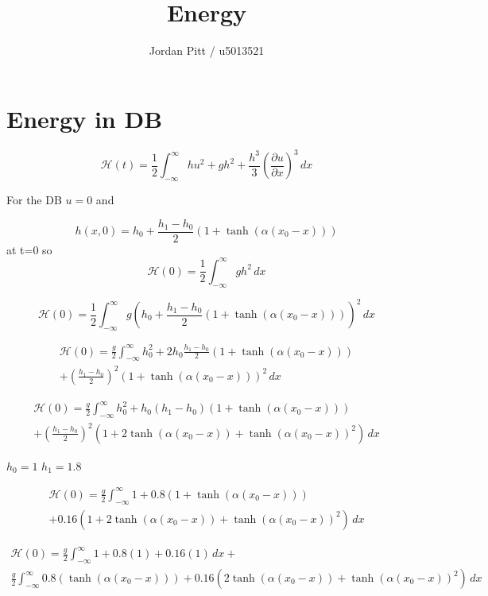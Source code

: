 \documentclass[12pt]{article}
\begin{document}
\title{Energy}
\author{Jordan Pitt / u5013521}

\section{Energy in DB}

\[\mathcal{H} (t) = \frac{1}{2}\int_{-\infty}^{\infty} hu^2 + gh^2 + \frac{h^3}{3} \left(\frac{\partial u}{\partial x}\right)^3\, dx \]

For the DB $u = 0$ and

\[h(x,0) = h_0 + \frac{h_1 - h_0}{2}\left(1 + \tanh\left(\alpha\left(x_0 - x\right)\right)\right)\]
at t=0 so
\[\mathcal{H} (0) = \frac{1}{2}\int_{-\infty}^{\infty}  gh^2 \, dx \]

\[\mathcal{H} (0) = \frac{1}{2}\int_{-\infty}^{\infty}  g\left(h_0 + \frac{h_1 - h_0}{2}\left(1 + \tanh\left(\alpha\left(x_0 - x\right)\right)\right)\right)^2 \, dx \]

\begin{multline}
\mathcal{H} (0) = \frac{g}{2}\int_{-\infty}^{\infty}  h_0^2 + 2h_0\frac{h_1 - h_0}{2}\left(1 + \tanh\left(\alpha\left(x_0 - x\right)\right)\right)  \\ + \left(\frac{h_1 - h_0}{2}\right)^2\left(1 + \tanh\left(\alpha\left(x_0 - x\right)\right)\right)^2 \, dx 
\end{multline}

\begin{multline}
\mathcal{H} (0) = \frac{g}{2}\int_{-\infty}^{\infty}  h_0^2 + h_0(h_1 - h_0)\left(1 + \tanh\left(\alpha\left(x_0 - x\right)\right)\right)  \\ + \left(\frac{h_1 - h_0}{2}\right)^2\left(1 + 2\tanh\left(\alpha\left(x_0 - x\right)\right) + \tanh\left(\alpha\left(x_0 - x\right)\right)^2\right) \, dx 
\end{multline}

$h_0 = 1$  $h_1 = 1.8$

\begin{multline}
\mathcal{H} (0) = \frac{g}{2}\int_{-\infty}^{\infty}  1 + 0.8\left(1 + \tanh\left(\alpha\left(x_0 - x\right)\right)\right)  \\ + 0.16\left(1 + 2\tanh\left(\alpha\left(x_0 - x\right)\right) + \tanh\left(\alpha\left(x_0 - x\right)\right)^2\right) \, dx 
\end{multline}


\begin{multline}
\mathcal{H} (0) = \frac{g}{2}\int_{-\infty}^{\infty}  1 + 0.8\left(1\right)  + 0.16\left(1\right) \, dx + \\
\frac{g}{2}\int_{-\infty}^{\infty}  0.8\left(\tanh\left(\alpha\left(x_0 - x\right)\right)\right)   + 0.16\left(2\tanh\left(\alpha\left(x_0 - x\right)\right) + \tanh\left(\alpha\left(x_0 - x\right)\right)^2\right) \, dx 
\end{multline}
\end{document}
